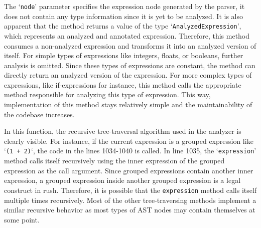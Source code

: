 The `\texttt{node}' parameter specifies the expression node generated by the parser,
it does not contain any type information since it is yet to be analyzed.
It is also apparent that the method returns a value of the type `\texttt{AnalyzedExpression}', which represents an analyzed and annotated expression.
Therefore, this method consumes a non-analyzed expression and transforms it into an analyzed version of itself.
For simple types of expressions like integers, floats, or booleans, further analysis is omitted.
Since these types of expressions are constant, the method can directly return an analyzed version of the expression.
For more complex types of expressions, like if-expressions for instance, this method calls the appropriate method responsible for analyzing this type of expression.
This way, implementation of this method stays relatively simple and the maintainability of the codebase increases.

In this function, the recursive tree-traversal algorithm used in the analyzer is clearly visible.
For instance, if the current expression is a grouped expression like `\texttt{(1 + 2)}`, the code in the lines 1034-1040 is called.
In line 1035, the `\texttt{expression}' method calls itself recursively using the inner expression of the grouped expression as the call argument.
Since grouped expressions contain another inner expression, a grouped expression inside another grouped expression is a legal construct in rush.
Therefore, it is possible that the \texttt{expression} method calls itself multiple times recursively.
Most of the other tree-traversing methods implement a similar recursive behavior as most types of AST nodes may contain themselves at some point.


